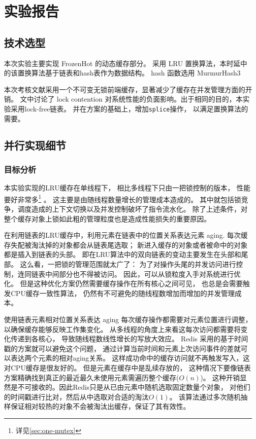 \maketitle

\section{实验报告}

\subsection{技术选型}

本次实验主要实现 FrozenHot\cite{qiu_frozenhot_2023} 的动态缓存部分。
采用 LRU 置换算法，本时延中的该置换算法基于链表和hash表作为数据结构。
hash 函数选用 MurmurHash3 \cite{SMHasher}

本次考核文献\cite{qiu_frozenhot_2023}采用一个不可变无锁前端缓存，显著减少了缓存在并发管理方面的开销。
文中讨论了 lock contention 对系统性能的负面影响。出于相同的目的，本实验采用lock-free链表。
并在\cite{timothy_l_harris_pragmatic_2001}方案的基础上，增加\verb|splice|操作，
以满足置换算法的需要。

\subsection{并行实现细节}

\subsubsection{目标分析}

本实验实现的LRU缓存在单线程下，
相比多线程下只由一把锁控制的版本，
性能要好非常多\footnote{详见\ref{sec:one-mutex}} 。
这主要是由随线程数量增长的管理成本造成的。
其中就包括锁竞争，调度造成的上下文切换以及并发控制破坏了指令流水化。
除了上述条件，对整个缓存对象上锁如此粗的管理粒度也是造成性能损失的重要原因。

在利用链表的LRU缓存中，利用元素在链表中的位置关系表达元素 aging.
每次缓存失配被淘汰掉的对象都会从链表尾选取；
新进入缓存的对象或者被命中的对象都是插入到链表的头部。
即在LRU算法中的双向链表的变动主要发生在头部和尾部。
这么看，一把锁的管理范围就太广了：
为了对操作头尾的并发访问进行控制，连同链表中间部分也不得被访问。
因此，可以从锁粒度入手对系统进行优化。
但是这种优化方案仍然需要缓存操作在所有核心之间可见，
也总是会需要触发CPU缓存一致性算法，
仍然有不可避免的随线程数增加而增加的并发管理成本。

使用链表元素相对位置关系表达 aging 每次缓存操作都需要对元素位置进行调整，
以确保缓存能够反映工作集变化。
从多线程的角度上来看这每次访问都需要将变化传递到各核心，
导致随线程数线性增长的写放大效应。
Redis 采用的基于时间戳的方案就可以避免这个问题，
通过计算当前时间和元素上次访问事件的差就可以表达两个元素的相对aging关系。
这样成功命中的缓存访问就不再触发写入，这对CPU缓存是很友好的。
但是元素在缓存中是乱续存放的，
这种情况下要像链表方案精确找到真正的最近最久未使用元素需遍历整个缓存($O(n)$)。
这种开销显然是不可接收的。因此Redis只是从已由元素中随机选取固定数量个对象，
对他们的时间戳进行比对，然后从中选取对合适的淘汰$O(1)$。
该算法通过多次随机抽样保证相对较热的对象不会被淘汰出缓存，保证了其有效性。

